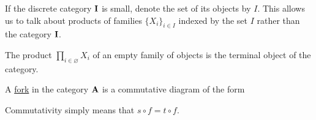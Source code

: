 \begin{note}\label{note:small_categorical_product}
  If the discrete category $\operatorname{\mathbf{I}}$ is small, denote the set of its objects by $I$. This allows us to talk about products of families $\{ X_i \}_{i \in I}$ indexed by the set $I$ rather than the category $\operatorname{\mathbf{I}}$.
\end{note}

\begin{note}\label{note:empty_categorical_product}
  The product $\prod_{i \in \varnothing} X_i$ of an empty family of objects is the terminal object of the category.
\end{note}

\begin{definition}\label{def:categorical_fork}\cite[112]{Leinster2014}
  A \uline{fork} in the category $\operatorname{\mathbf{A}}$ is a commutative diagram of the form
  \begin{center}
  \end{center}

  Commutativity simply means that $s \circ f = t \circ f$.
\end{definition}

